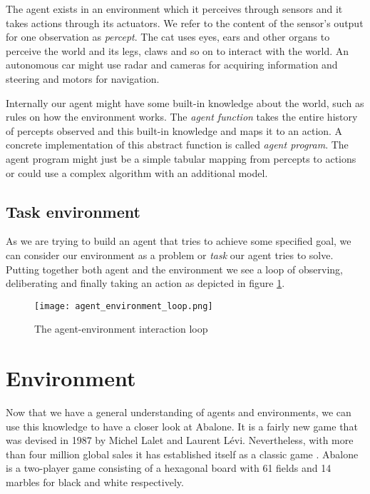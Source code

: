 The agent exists in an environment which it perceives through sensors and it takes actions through its actuators. We refer to the content of the sensor's output for one observation as \textit{percept}. The cat uses eyes, ears and other organs to perceive the world and its legs, claws and so on to interact with the world. An autonomous car might use radar and cameras for acquiring information and steering and motors for navigation.

Internally our agent might have some built-in knowledge about the world, such as rules on how the environment works. The \textit{agent function} takes the entire history of percepts observed and this built-in knowledge and maps it to an action. A concrete implementation of this abstract function is called \textit{agent program}. The agent program might just be a simple tabular mapping from percepts to actions or could use a complex algorithm with an additional model.

\subsection{Task environment}

As we are trying to build an agent that tries to achieve some specified goal, we can consider our environment as a problem or \textit{task} our agent tries to solve. Putting together both agent and the environment we see a loop of observing,  deliberating and finally taking an action as depicted in figure \ref{agent_environment_loop}.

\begin{figure}
    \centering
    \texttt{[image: agent\_environment\_loop.png]}
    \caption{The agent-environment interaction loop}
    \label{agent_environment_loop}
\end{figure}

\section{Environment}
Now that we have a general understanding of agents and environments, we can use this knowledge to have a closer look at Abalone. It is a fairly new game that was devised in 1987 by Michel Lalet and Laurent Lévi. Nevertheless, with more than four million global sales it has established itself as a classic game \cite{noauthor_abalone_2020}. Abalone is a two-player game consisting of a hexagonal board with 61 fields and 14 marbles for black and white respectively.

